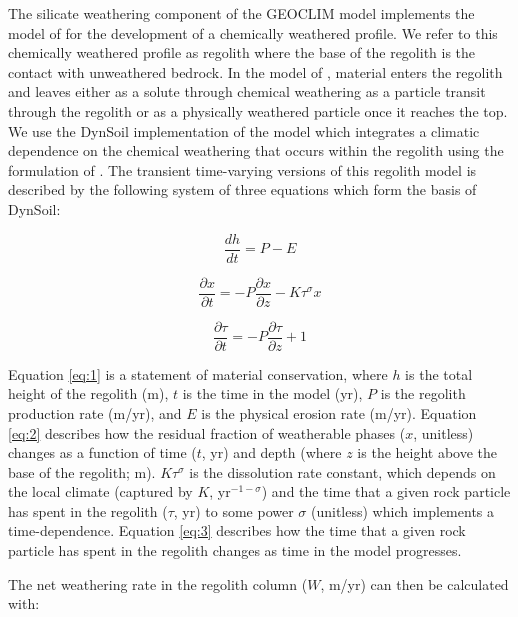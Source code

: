 \documentclass[11pt,letterpaper]{article}
\begin{document}
The silicate weathering component of the GEOCLIM model implements the model of \cite{Gabet2009a} for the development of a chemically weathered profile. We refer to this chemically weathered profile as regolith where the base of the regolith is the contact with unweathered bedrock. In the model of \citet{Gabet2009a}, material enters the regolith and leaves either as a solute through chemical weathering as a particle transit through the regolith or as a physically weathered particle once it reaches the top. We use the DynSoil implementation of the \cite{Gabet2009a} model which integrates a climatic dependence on the chemical weathering that occurs within the regolith using the formulation of \cite{West2012a}. The transient time-varying versions of this regolith model is described by the following system of three equations which form the basis of DynSoil:

\begin{equation}
    \frac{dh}{dt} = P - E
    \label{eq:1}
\end{equation}

\begin{equation}
    \frac{\partial x}{\partial t} = -P \frac{\partial x}{\partial z} - K \tau^{\sigma}x
    \label{eq:2}
\end{equation}

\begin{equation}
    \frac{\partial \tau}{\partial t} = -P \frac{\partial \tau}{\partial z} + 1
    \label{eq:3}
\end{equation}

\noindent
Equation \ref{eq:1} is a statement of material conservation, where $h$ is the total height of the regolith (m), $t$ is the time in the model (yr), $P$ is the regolith production rate (m/yr), and $E$ is the physical erosion rate (m/yr). Equation \ref{eq:2} describes how the residual fraction of weatherable phases ($x$, unitless) changes as a function of time ($t$, yr) and depth (where $z$ is the height above the base of the regolith; m). $K \tau^{\sigma}$ is the dissolution rate constant, which depends on the local climate (captured by $K$, yr$^{-1-\sigma}$) and the time that a given rock particle has spent in the regolith ($\tau$, yr) to some power $\sigma$ (unitless) which implements a time-dependence. Equation \ref{eq:3} describes how the time that a given rock particle has spent in the regolith changes as time in the model progresses.

The net weathering rate in the regolith column ($W$, m/yr) can then be calculated with:
\end{document}

